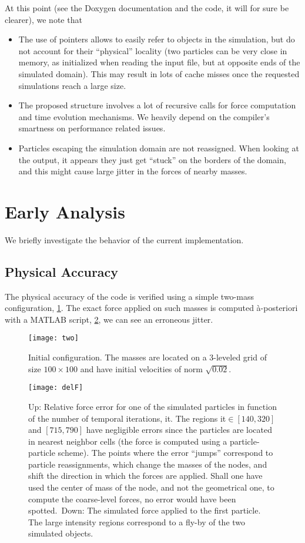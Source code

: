 \documentclass[10pt,a4paper]{scrartcl}
\begin{document}
	At this point (see the Doxygen documentation and the code, it will for sure be clearer), we note that
	\begin{itemize}
		\item The use of pointers allows to easily refer to objects in the simulation, but do not account for their ``physical'' locality (two particles can be very close in memory, as initialized when reading the input file, but at opposite ends of the simulated domain). This may result in lots of cache misses once the requested simulations reach a large size.
		\item The proposed structure involves a lot of recursive calls for force computation and time evolution mechanisms. We heavily depend on the compiler's smartness on performance related issues.
		\item Particles escaping the simulation domain are not reassigned. When looking at the output, it appears they just get ``stuck'' on the borders of the domain, and this might cause large jitter in the forces of nearby masses.
	\end{itemize}
	
	\section{Early Analysis}
	We briefly investigate the behavior of the current implementation.
	\subsection{Physical Accuracy}
	The physical accuracy of the code is verified using a simple two-mass configuration, \cref{fig:two}. The exact force applied on such masses is computed à-posteriori with a MATLAB script, \cref{fig:delf}, we can see an erroneous jitter.
	\begin{figure}
		\centering
		\texttt{[image: two]}
		\caption{Initial configuration. The masses are located on a 3-leveled grid of size $100\times100$ and have initial velocities of norm $\sqrt{0.02}$.}
		\label{fig:two}
	\end{figure}
	\begin{figure}
	\centering
	\texttt{[image: delF]}
	\caption{Up: Relative force error for one of the simulated particles in function of the number of temporal iterations, it. The regions it$\in[140,320]$ and $[715,790]$ have negligible errors since the particles are located in nearest neighbor cells (the force is computed using a particle-particle scheme). The points where the error ``jumps'' correspond to particle reassignments, which change the masses of the nodes, and shift the direction in which the forces are applied. Shall one have used the center of mass of the node, and not the geometrical one, to compute the coarse-level forces, no error would have been spotted.~Down: The simulated force applied to the first particle. The large intensity regions correspond to a fly-by of the two simulated objects.}
	\label{fig:delf}
	\end{figure}
\end{document}
